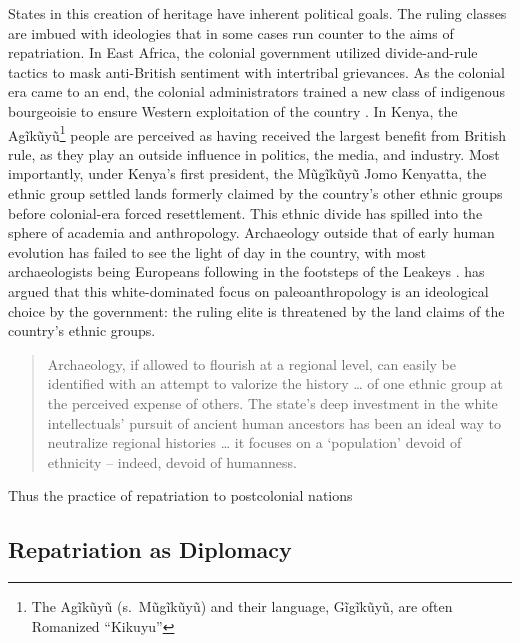 \documentclass[american]{../../../coursework}
\begin{document}
States in this creation of heritage have inherent political goals. The ruling
classes are imbued with ideologies that in some cases run counter to the aims
of repatriation. In East Africa, the colonial government utilized
divide-and-rule tactics to mask anti-British sentiment with intertribal
grievances. As the colonial era came to an end, the colonial administrators
trained a new class of indigenous bourgeoisie to ensure Western exploitation
of the country \parencite{Mut79}. In Kenya, the Agĩkũyũ\footnote{The Agĩkũyũ
(s.\ Mũgĩkũyũ) and their language, Gĩgĩkũyũ, are often Romanized ``Kikuyu''}
people are perceived as having received the largest benefit from British rule,
as they play an outside influence in politics, the media, and industry. Most
importantly, under Kenya's first president, the Mũgĩkũyũ Jomo Kenyatta, the
ethnic group settled lands formerly claimed by the country's other ethnic
groups before colonial-era forced resettlement. This ethnic divide has spilled
into the sphere of academia and anthropology. Archaeology outside that of
early human evolution has failed to see the light of day in the country, with
most archaeologists being Europeans following in the footsteps of the Leakeys
\parencite{Kof97}. \textcite{Sch95} has argued that this white-dominated focus
on paleoanthropology is an ideological choice by the government: the ruling
elite is threatened by the land claims of the country's ethnic groups.

\begin{quote}
    Archaeology, if allowed to flourish at a regional level, can easily be
    identified with an attempt to valorize the history … of one ethnic group
    at the perceived expense of others. The state's deep investment in the
    white intellectuals' pursuit of ancient human ancestors has been an ideal
    way to neutralize regional histories … it focuses on a `population' devoid
    of ethnicity -- indeed, devoid of humanness.
    
    \parencite[128-129]{Sch95}
\end{quote}

Thus the practice of repatriation to postcolonial nations 

\subsection{Repatriation as Diplomacy}
\end{document}

